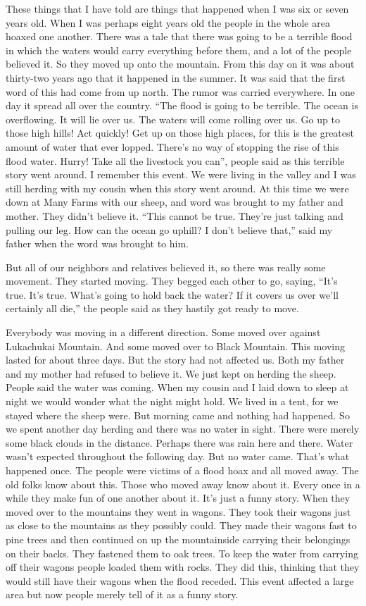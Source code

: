 These things that I have told are things that happened when I was six or seven years old. When I was perhaps eight years old the people in the whole area hoaxed one another. There was a tale that there was going to be a terrible flood in which the waters would carry everything before them, and a lot of the people believed it. So they moved up onto the mountain. From this day on it was about thirty-two years ago that it happened in the summer. It was said that the first word of this had come from up north. The rumor was carried everywhere. In one day it spread all over the country. ``The flood is going to be terrible. The ocean is overflowing. It will lie over us. The waters will come rolling over us. Go up to those high hills! Act quickly! Get up on those high places, for this is the greatest amount of water that ever lopped. There's no way of stopping the rise of this flood water. Hurry! Take all the livestock you can'', people said as this terrible story went around. I remember this event. We were living in the valley and I was still herding with my cousin when this story went around. At this time we were down at Many Farms with our sheep, and word was brought to my father and mother. They didn't believe it. ``This cannot be true. They're just talking and pulling our leg. How can the ocean go uphill? I don't believe that,'' said my father when the word was brought to him.

But all of our neighbors and relatives believed it, so there was really some movement. They started moving. They begged each other to go, saying, ``It's true. It's true. What's going to hold back the water? If it covers us over we'll certainly all die,'' the people said as they hastily got ready to move.

Everybody was moving in a different direction. Some moved over against Lukachukai Mountain. And some moved over to Black Mountain. This moving lasted for about three days. But the story had not affected us. Both my father and my mother had refused to believe it. We just kept on herding the sheep. People said the water was coming. When my cousin and I laid down to sleep at night we would wonder what the night might hold. We lived in a tent, for we stayed where the sheep were. But morning came and nothing had happened. So we spent another day herding and there was no water in sight. There were merely some black clouds in the distance. Perhaps there was rain here and there. Water wasn't expected throughout the following day. But no water came. That's what happened once. The people were victims of a flood hoax and all moved away. The old folks know about this. Those who moved away know about it. Every once in a while they make fun of one another about it. It's just a funny story. When they moved over to the mountains they went in wagons. They took their wagons just as close to the mountains as they possibly could. They made their wagons fast to pine trees and then continued on up the mountainside carrying their belongings on their backs. They fastened them to oak trees. To keep the water from carrying off their wagons people loaded them with rocks. They did this, thinking that they would still have their wagons when the flood receded. This event affected a large area but now people merely tell of it as a funny story.

